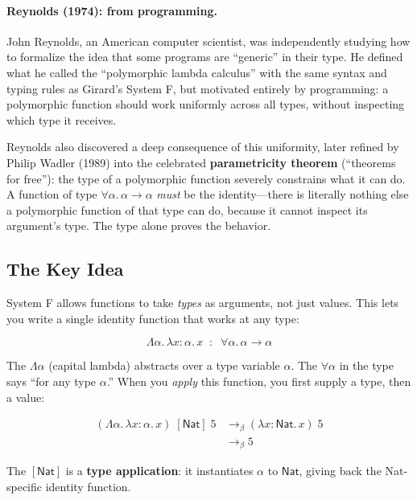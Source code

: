 \documentclass[11pt,a4paper]{article}
\theoremstyle{definition}
\newcommand{\lam}{\lambda}
\newcommand{\Lam}{\Lambda}
\newcommand{\reduce}{\longrightarrow_\beta}
\begin{document}
\paragraph{Reynolds (1974): from programming.} John Reynolds, an American
computer scientist, was independently studying how to formalize the idea
that some programs are ``generic'' in their type. He defined what he called
the ``polymorphic lambda calculus'' with the same syntax and typing rules
as Girard's System F, but motivated entirely by programming: a polymorphic
function should work uniformly across all types, without inspecting which
type it receives.

Reynolds also discovered a deep consequence of this uniformity, later refined
by Philip Wadler (1989) into the celebrated \textbf{parametricity theorem}
(``theorems for free''): the type of a polymorphic function severely constrains
what it can do. A function of type $\forall\alpha.\, \alpha \to \alpha$ \emph{must}
be the identity---there is literally nothing else a polymorphic function of
that type can do, because it cannot inspect its argument's type. The type alone
proves the behavior.

\subsection{The Key Idea}

System F allows functions to take \emph{types} as arguments, not just
values. This lets you write a single identity function that works at any type:

\[
\Lam\alpha.\, \lam x{:}\alpha.\, x \;\;:\;\; \forall\alpha.\, \alpha \to \alpha
\]

The $\Lam\alpha$ (capital lambda) abstracts over a type variable $\alpha$.
The $\forall\alpha$ in the type says ``for any type $\alpha$.'' When you
\emph{apply} this function, you first supply a type, then a value:

\begin{align*}
  (\Lam\alpha.\, \lam x{:}\alpha.\, x)\;[\textsf{Nat}]\;5
    &\reduce (\lam x{:}\textsf{Nat}.\, x)\;5 \\
    &\reduce 5
\end{align*}

The $[\textsf{Nat}]$ is a \textbf{type application}: it instantiates $\alpha$
to $\textsf{Nat}$, giving back the Nat-specific identity function.
\end{document}
